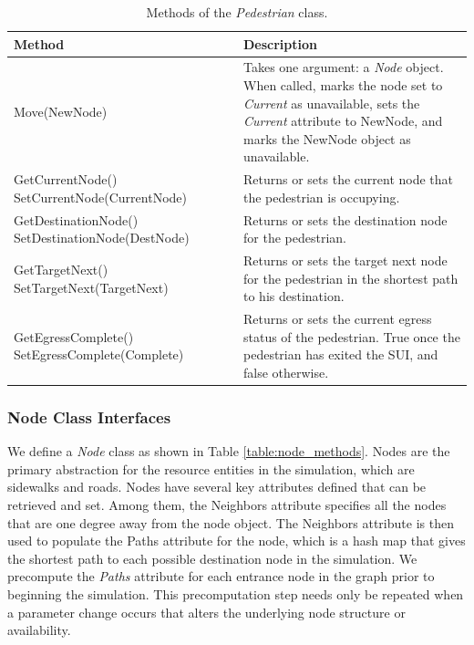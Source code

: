 \documentclass[12pt]{article}
\begin{document}
\def\arraystretch{1.5}
\begin{table}
  \centering
    \begin{tabular}{p{0.5\linewidth}p{0.5\linewidth}}
     \hline
     Method & Description \\
     \hline
     Move(NewNode) & Takes one argument: a \textit{Node} object. When called,
                     marks the node set to \textit{Current} as unavailable,
                     sets the \textit{Current} attribute to NewNode,
                     and marks the NewNode object as unavailable. \\
     GetCurrentNode() \newline SetCurrentNode(CurrentNode) & Returns or sets
                        the current node that the pedestrian is occupying. \\
     GetDestinationNode() \newline SetDestinationNode(DestNode) & Returns or
                        sets the destination node for the pedestrian. \\
     GetTargetNext() \newline SetTargetNext(TargetNext) & Returns or
                       sets the target next node for the pedestrian in the
                       shortest path to his destination. \\
     GetEgressComplete() \newline SetEgressComplete(Complete) & Returns or
                        sets the current egress status of the pedestrian. True
                        once the pedestrian has exited the SUI, and false
                        otherwise. \\
     \hline
    \end{tabular}
    \caption{Methods of the \textit{Pedestrian} class.}
  \label{table:pedestrian_methods}
\end{table}

\subsubsection{Node Class Interfaces}
We define a \textit{Node} class as shown in Table \ref{table:node_methods}.
Nodes are the primary abstraction for the resource entities in the simulation,
which are sidewalks and roads. Nodes have several key attributes defined that
can be retrieved and set. Among them, the Neighbors attribute specifies all the
nodes that are one degree away from the node object. The Neighbors attribute is
then used to populate the Paths attribute for the node, which is a hash map
that gives the shortest path to each possible destination node
in the simulation. We precompute the \textit{Paths} attribute for each entrance
node in the graph prior to beginning the simulation. This precomputation step
needs only be repeated when a parameter change occurs that alters the underlying
node structure or availability.
\end{document}
